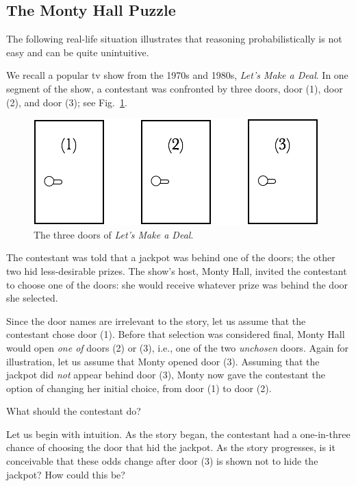 \subsection{The Monty Hall Puzzle}
\label{sec:monty-hall}

The following real-life situation illustrates that reasoning
probabilistically is not easy and can be quite unintuitive.

We recall a popular tv show from the 1970s and 1980s, \textit{Let's
  Make a Deal}. In one segment of the show, a
contestant was confronted by three doors, door (1), door (2), and door
(3); see Fig.~\ref{fig:MonthyHal-1}.
\begin{figure}[htb]
\begin{center}
        \includegraphics[scale=0.4]{FiguresMaths/MonthyHallInitial}
        \caption{The three doors of \textit{Let's Make a Deal}.}
        \label{fig:MonthyHal-1}
\end{center}
\end{figure}
The contestant was told that a jackpot was behind one of the doors;
the other two hid less-desirable prizes.  The show's host, Monty Hall,
 invited the contestant to choose one of the doors:
she would receive whatever prize was behind the door she selected.

Since the door names are irrelevant to the story, let us assume that
the contestant chose door (1).  Before that selection was considered
final, Monty Hall would open {\em one of} doors (2) or (3), i.e., one
of the two {\em unchosen} doors.  Again for illustration, let us
assume that Monty opened door (3).  Assuming that the jackpot did {\em
  not} appear behind door (3), Monty now gave the contestant the
option of changing her initial choice, from door (1) to door (2).

What should the contestant do?  

Let us begin with intuition.  As the story began, the contestant had a
one-in-three chance of choosing the door that hid the jackpot.  As the
story progresses, is it conceivable that these odds change after door
(3) is shown not to hide the jackpot?  How could this be?

